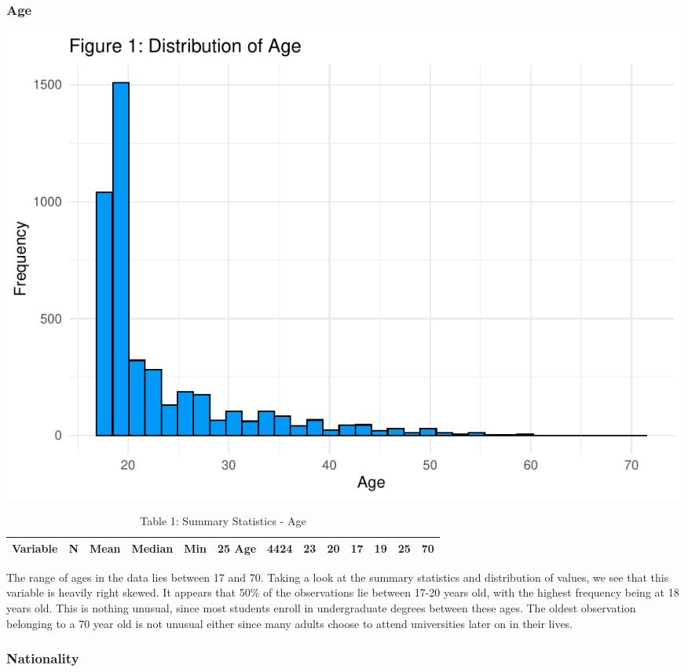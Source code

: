 \documentclass[
]{article}
\begin{document}
\hypertarget{age}{%
\subsubsection{Age}\label{age}}

\begin{center}\includegraphics{finalproj_files/figure-latex/unnamed-chunk-6-1} \end{center}

\begin{table}

\caption{\label{tab:unnamed-chunk-6}Table 1: Summary Statistics - Age}
\centering
\begin{tabular}[t]{llllllll}
\toprule
Variable & N & Mean & Median & Min & 25%
\midrule
Age & 4424 & 23 & 20 & 17 & 19 & 25 & 70\\
\bottomrule
\end{tabular}
\end{table}

The range of ages in the data lies between 17 and 70. Taking a look at
the summary statistics and distribution of values, we see that this
variable is heavily right skewed. It appears that 50\% of the
observations lie between 17-20 years old, with the highest frequency
being at 18 years old. This is nothing unusual, since most students
enroll in undergraduate degrees between these ages. The oldest
observation belonging to a 70 year old is not unusual either since many
adults choose to attend universities later on in their lives.

\hypertarget{nationality}{%
\subsubsection{Nationality}\label{nationality}}
\end{document}
